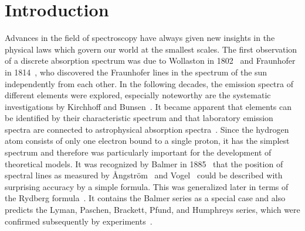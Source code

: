 \chapter*{Introduction}
Advances in the field of spectroscopy have always given new insights in the physical laws which govern our world at the smallest scales. %
The first observation of a discrete absorption spectrum was due to Wollaston in 1802~\cite{wollaston1802} and Fraunhofer in 1814~\cite{fraunhofer1817}, who discovered the Fraunhofer lines in the spectrum of the sun independently from each other.
In the following decades, the emission spectra of different elements were explored, especially noteworthy are the systematic investigations by Kirchhoff and Bunsen~\cite{kirchhoff1860,kirchhoff1861}. It became apparent that elements can be identified by their characteristic spectrum and that laboratory emission spectra are connected to astrophysical absorption spectra~\cite{angstrom1862}.
Since the hydrogen atom consists of only one electron bound to a single proton, it has the simplest spectrum and therefore was particularly important for the development of theoretical models. It was recognized by Balmer in 1885~\cite{balmer1885} that the position of spectral lines as measured by Ångström~\cite{angstrom1853} and Vogel~\cite{vogel1880} could be described with surprising accuracy by a simple formula. This was generalized later in terms of the Rydberg formula~\cite{rydberg1889,martinson2005}. It contains the Balmer series as a special case and also predicts the Lyman, Paschen, Brackett, Pfund, and Humphreys series, which were confirmed subsequently by experiments~\cite{lyman1906,paschen1908,brackett1922,pfund1924,humphrey1953}.
















~\cite{haensch1979}
















\clearpage
